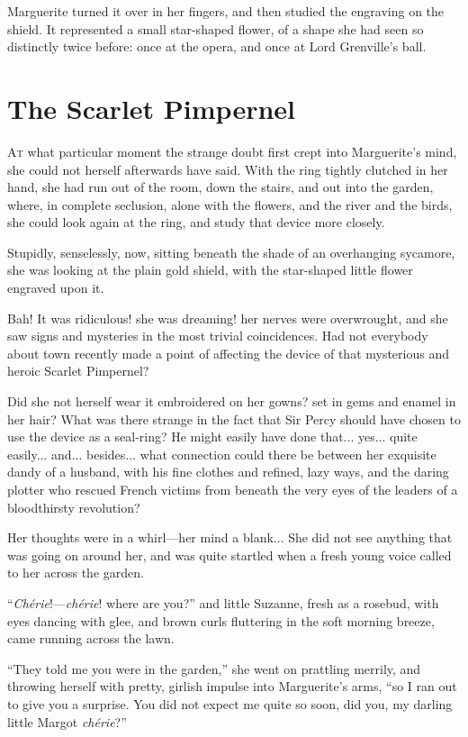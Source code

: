 \documentclass[paper=5.5in:8.5in,BCOR=7mm,twoside,DIV=calc,12pt,usegeometry,chapterprefix,endperiod,headings=big]{scrbook}
\begin{document}
Marguerite turned it over in her fingers, and then studied the engraving on the shield. It represented a small star-shaped flower, of a shape she had seen so distinctly twice before: once at the opera, and once at Lord Grenville's ball.

\chapter{The Scarlet Pimpernel}
\lettrine[lines=4]{A}{t} what particular moment the strange doubt first crept into Marguerite's mind, she could not herself afterwards have said. With the ring tightly clutched in her hand, she had run out of the room, down the stairs, and out into the garden, where, in complete seclusion, alone with the flowers, and the river and the birds, she could look again at the ring, and study that device more closely.

Stupidly, senselessly, now, sitting beneath the shade of an overhanging sycamore, she was looking at the plain gold shield, with the star-shaped little flower engraved upon it.

Bah! It was ridiculous! she was dreaming! her nerves were overwrought, and she saw signs and mysteries in the most trivial coincidences. Had not everybody about town recently made a point of affecting the device of that mysterious and heroic Scarlet Pimpernel?

Did she not herself wear it embroidered on her gowns? set in gems and enamel in her hair? What was there strange in the fact that Sir Percy should have chosen to use the device as a seal-ring? He might easily have done that... yes... quite easily... and... besides... what connection could there be between her exquisite dandy of a husband, with his fine clothes and refined, lazy ways, and the daring plotter who rescued French victims from beneath the very eyes of the leaders of a bloodthirsty revolution?

Her thoughts were in a whirl---her mind a blank... She did not see anything that was going on around her, and was quite startled when a fresh young voice called to her across the garden.

\enquote{\textit{Chérie}!---\textit{chérie}! where are you?} and little Suzanne, fresh as a rosebud, with eyes dancing with glee, and brown curls fluttering in the soft morning breeze, came running across the lawn.

\enquote{They told me you were in the garden,} she went on prattling merrily, and throwing herself with pretty, girlish impulse into Marguerite's arms, \enquote{so I ran out to give you a surprise. You did not expect me quite so soon, did you, my darling little Margot \textit{chérie}?}
\end{document}
